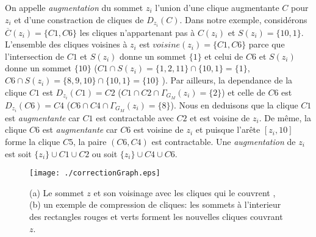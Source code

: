 On appelle {\em  augmentation} du sommet $z_i$ l'union d'une clique augmentante  $C$ pour $z_i$ et d'une constraction de cliques de $D_{z_i}(C)$.
\newline
Dans notre exemple, consid\'erons  $\overbar{C}(z_i) = \{C1, C6\}$  les cliques n'appartenant pas \`a $C(z_i)$ et $S(z_i) = \{10,1\}$.
L'ensemble des cliques voisines \`a $z_i$ est $voisine(z_i) = \{C1, C6\}$ parce que l'intersection de $C1$ et $S(z_i)$ donne un sommet $\{1\}$ et celui de $C6$ et $S(z_i)$ donne un sommet $\{10\}$
($C1 \cap S(z_i) = \{1,2,11\} \cap \{10,1\} = \{1\}$,
$C6 \cap S(z_i) = \{8,9,10\} \cap \{10,1\} = \{10\}$
).
Par ailleurs, la dependance de la clique $C1$ est $D_{z_i}(C1) = C2$ ($C1 \cap C2 \cap \Gamma_{G_M}(z_i) = \{2\}$) et celle de $C6$ est $D_{z_i}(C6) = C4$ ($C6 \cap C4 \cap \Gamma_{G_M}(z_i) = \{8\}$). 
Nous en deduisons que la clique $C1$ est {\em augmentante} car  $C1$ est contractable avec $C2$ et est voisine de $z_i$. De m\^eme, la clique $C6$ est {\em augmentante} car $C6$ est voisine de $z_i$ et puisque l'ar\^ete $[z_i,10]$ forme la clique $C5$, la paire $(C6,C4)$ est contractable.
Une {\em augmentation} de $z_i$ est soit $\{z_i\} \cup C1 \cup C2$ ou soit $\{z_i\} \cup C4 \cup C6$.
\begin{figure}[htb!]
\centering
\texttt{[image: ./correctionGraph.eps]} \vspace{-0.5em}
\caption{(a) Le sommet $z$ et son voisinage avec les cliques qui le couvrent , (b) un exemple de compression de cliques:  les sommets \`a l'interieur des rectangles rouges et verts forment les nouvelles cliques couvrant $z$.}
\label{exempleAlgoCorrectionGraphe}
\end{figure}


